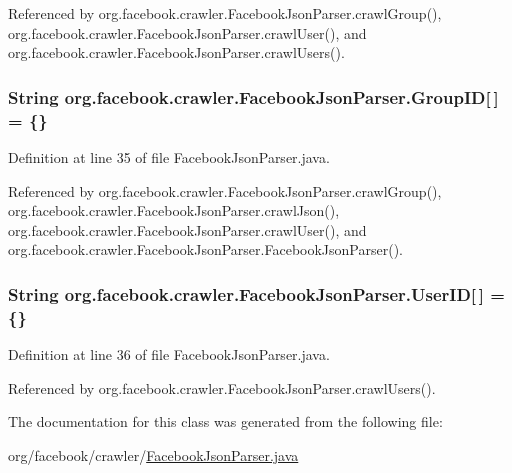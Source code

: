 Referenced by org.\-facebook.\-crawler.\-Facebook\-Json\-Parser.\-crawl\-Group(), org.\-facebook.\-crawler.\-Facebook\-Json\-Parser.\-crawl\-User(), and org.\-facebook.\-crawler.\-Facebook\-Json\-Parser.\-crawl\-Users().

\hypertarget{classorg_1_1facebook_1_1crawler_1_1_facebook_json_parser_a648157fbf1ba62f4197ce78c35a4a5da}{
\subsubsection[{Group\-I\-D}]{\setlength{\rightskip}{0pt plus 5cm}String org.\-facebook.\-crawler.\-Facebook\-Json\-Parser.\-Group\-I\-D\mbox{[}$\,$\mbox{]} = \{\}\hspace{0.3cm}{\ttfamily [private]}}}\label{classorg_1_1facebook_1_1crawler_1_1_facebook_json_parser_a648157fbf1ba62f4197ce78c35a4a5da}


Definition at line 35 of file Facebook\-Json\-Parser.\-java.



Referenced by org.\-facebook.\-crawler.\-Facebook\-Json\-Parser.\-crawl\-Group(), org.\-facebook.\-crawler.\-Facebook\-Json\-Parser.\-crawl\-Json(), org.\-facebook.\-crawler.\-Facebook\-Json\-Parser.\-crawl\-User(), and org.\-facebook.\-crawler.\-Facebook\-Json\-Parser.\-Facebook\-Json\-Parser().

\hypertarget{classorg_1_1facebook_1_1crawler_1_1_facebook_json_parser_ac872d203f33324d357f697597cc51da0}{
\subsubsection[{User\-I\-D}]{\setlength{\rightskip}{0pt plus 5cm}String org.\-facebook.\-crawler.\-Facebook\-Json\-Parser.\-User\-I\-D\mbox{[}$\,$\mbox{]} = \{\}\hspace{0.3cm}{\ttfamily [private]}}}\label{classorg_1_1facebook_1_1crawler_1_1_facebook_json_parser_ac872d203f33324d357f697597cc51da0}


Definition at line 36 of file Facebook\-Json\-Parser.\-java.



Referenced by org.\-facebook.\-crawler.\-Facebook\-Json\-Parser.\-crawl\-Users().



The documentation for this class was generated from the following file\-:\begin{DoxyCompactItemize}
\item 
org/facebook/crawler/\hyperlink{_facebook_json_parser_8java}{Facebook\-Json\-Parser.\-java}\end{DoxyCompactItemize}
